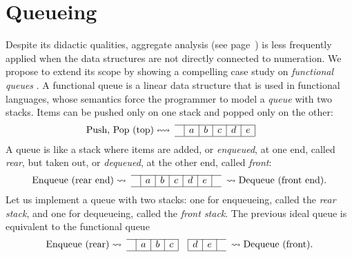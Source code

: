 \section{Queueing}
\label{sec:queueing}

Despite its didactic qualities, aggregate analysis (see
page~\pageref{par:aggregate}) is less frequently applied when the data
structures are not directly connected to numeration. We propose to
extend its scope by showing a compelling case study on
\emph{functional queues}
\citep{Burton_1982,Okasaki_1995,Okasaki_1998b}. A functional queue is
a linear data structure that is used in functional languages, whose
semantics force the programmer to model a \emph{queue} with two
stacks. Items can be pushed only on one stack and popped only on the
other:
\begin{equation*}
\begin{array}{@{}l@{}r@{\;}cc|c|c|c|c|c|cc@{\;}l@{}}
\cline{4-9}
& \text{Push, Pop (top)}
& \leftrightsquigarrow & & a & b & c & d & e &&&\\
\cline{4-9}
\end{array}
\end{equation*}
A queue is like a stack where items are added, or \emph{enqueued}, at
one end, called \emph{rear}, but taken out, or \emph{dequeued}, at the
other end, called \emph{front}:
\begin{equation*}
\begin{array}{@{}l@{}r@{\;}cc|c|c|c|c|c|cc@{\;}l@{}}
\cline{4-10}
& \text{Enqueue (rear end)}
                & \rightsquigarrow & & a & b & c & d & e &
& \rightsquigarrow & \text{Dequeue (front end).}\\
\cline{4-10}
\end{array}
\end{equation*}
Let us implement a queue with two stacks: one for enqueueing, called
the \emph{rear stack}, and one for dequeueing, called the \emph{front
  stack}. The previous ideal queue is equivalent to the
functional queue
\begin{equation*}
\begin{array}{r@{\;}cc|c|c|c|c|c|c|cc@{\;}l}
  \cline{3-6}\cline{8-10}
  \text{Enqueue (rear)} & \rightsquigarrow & & a & b & c & & d & e & &
  \rightsquigarrow & \text{Dequeue (front).}\\
  \cline{3-6}\cline{8-10}
\end{array}
\end{equation*}
